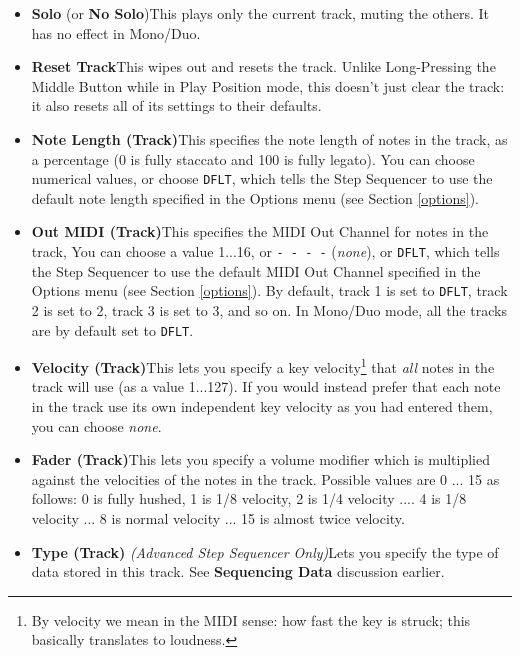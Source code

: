 \documentclass{article}
\begin{document}
\begin{itemize}
\item {\bf Solo} (or {\bf No Solo})\quad This plays only the current track, muting the others.  It has no effect in Mono/Duo.
\item {\bf Reset Track}\quad This wipes out and resets the track.  Unlike Long-Pressing the Middle Button while in Play Position mode, this doesn't just clear the track: it also resets all of its settings to their defaults.
\item {\bf Note Length (Track)}\quad This specifies the note length of notes in the track, as a percentage (0 is fully staccato and 100 is fully legato).   You can choose numerical values, or choose \texttt{DFLT}, which tells the Step Sequencer to use the default note length specified in the Options menu (see Section \ref{options}).
\item {\bf Out MIDI (Track)}\quad This specifies the MIDI Out Channel for notes in the track,    You can choose a value 1...16, or \texttt{- - - -} ({\it none}), or \texttt{DFLT}, which tells the Step Sequencer to use the default MIDI Out Channel specified in the Options menu (see Section \ref{options}).  By default, track 1 is set to \texttt{DFLT}, track 2 is set to 2, track 3 is set to 3, and so on.  In Mono/Duo mode, all the tracks are by default set to \texttt{DFLT}.
\item {\bf Velocity (Track)}\quad This lets you specify a key velocity\footnote{By velocity we mean in the MIDI sense: how fast the key is struck; this basically translates to loudness.} that {\it all} notes in the track will use (as a value 1...127).  If you would instead prefer that each note in the track use its own independent key velocity as you had entered them, you can choose {\it none}.  
\item {\bf Fader (Track)}\quad This lets you specify a volume modifier which is multiplied against the velocities of the notes in the track.  Possible values are 0 ... 15 as follows: 0 is fully hushed, 1 is 1/8 velocity, 2 is 1/4 velocity .... 4 is 1/8 velocity ... 8 is normal velocity ... 15 is almost twice velocity.
\item {\bf Type (Track)} {\it (Advanced Step Sequencer Only)}\quad Lets you specify the type of data stored in this track.  See {\bf Sequencing Data} discussion earlier.

\end{itemize}
\end{document}
